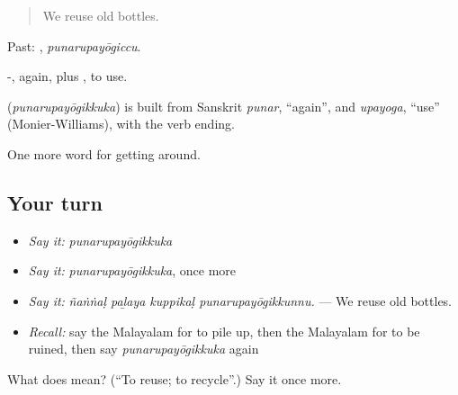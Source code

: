 \begin{quote}
We reuse old bottles.
\end{quote}

Past: , \emph{punarupayōgiccu}.

-, again, plus , to use.

\begin{cousinweb}
\textbf{} (\emph{punarupayōgikkuka}) is built from Sanskrit \emph{punar}, \textquotedblleft{}again\textquotedblright{}, and \emph{upayoga}, \textquotedblleft{}use\textquotedblright{} (Monier-Williams), with the verb ending.
\end{cousinweb}

\begin{grammarlens}[title={What you've built}]
One more word for getting around.
\end{grammarlens}

\subsection*{Your turn}
\begin{itemize}
\raggedright
  \item \emph{Say it:} \emph{punarupayōgikkuka}
  \item \emph{Say it:} \emph{punarupayōgikkuka}, once more
  \item \emph{Say it:} \emph{ñaṅṅaḷ paḻaya kuppikaḷ punarupayōgikkunnu.} — We reuse old bottles.
  \item \emph{Recall:} say the Malayalam for to pile up, then the Malayalam for to be ruined, then say \emph{punarupayōgikkuka} again
\end{itemize}

\begin{tcolorbox}[breakable,colback=teal!4,colframe=teal!35!black,title={Before you move on}]
What does  mean? (\textquotedblleft{}To reuse; to recycle\textquotedblright{}.) Say it once more.
\end{tcolorbox}
